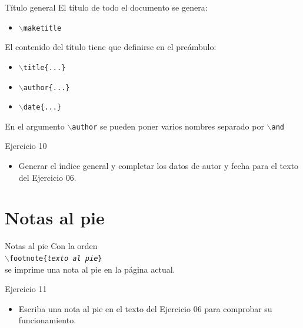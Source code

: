     \begin{frame}
        \begin{block}{T\'itulo general}
            El t\'itulo de todo el documento se genera:
            \begin{itemize}
                \item  \texttt{$\backslash$maketitle}
            \end{itemize}
            El contenido del t\'itulo tiene que definirse en el pre\'ambulo:
            \begin{itemize}
                \item \texttt{$\backslash$title\{...\}}
                \item \texttt{$\backslash$author\{...\}}
                \item \texttt{$\backslash$date\{...\}}
            \end{itemize}

            En el argumento \texttt{$\backslash$author} se pueden poner varios nombres separado por \texttt{$\backslash$and}
        \end{block}

        \begin{exampleblock}{Ejercicio 10}
            \begin{itemize}
                \item Generar el \'indice general y completar los datos de autor y fecha para el texto del Ejercicio 06.
            \end{itemize}
        \end{exampleblock}
    \end{frame}

    \section{Notas al pie}

    \begin{frame}{Notas al pie}
        Con la orden \\
        \texttt{$\backslash$footnote\{\emph{texto al pie}\}} \\
        se imprime una nota al pie en la p\'agina actual. 
            
        \begin{exampleblock}{Ejercicio 11}
            \begin{itemize}
                \item Escriba una nota al pie en el texto del Ejercicio 06 para comprobar su funcionamiento.
            \end{itemize}
        \end{exampleblock}

    \end{frame}

